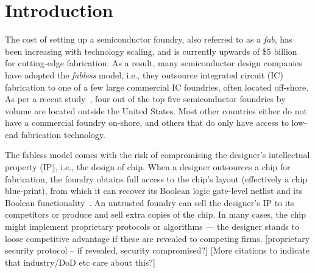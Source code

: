 \section{Introduction}

The cost of setting up a semiconductor foundry, also referred to 
as a \emph{fab}, 
has been increasing with technology scaling, and is 
currently upwards of \$5 billion~\cite{FoundryCost} for 
cutting-edge fabrication.
As a result, 
many semiconductor design companies have 
adopted the \textit{fabless} model, i.e., they outsource integrated circuit (IC) fabrication to one of a few large commercial IC foundries, often located off-shore. 
As per a recent study~\cite{}, 
four out of the 
top five semiconductor foundries by 
volume are located outside the United States. Most other countries  
either do not have a commercial 
foundry on-shore, and others that do only have access to low-end fabrication technology.  

The fabless model comes with the risk of compromising the 
designer's intellectual property (IP), i.e., the design of chip. 
When a designer outsources a chip for fabrication, the 
foundry obtains full access 
to the chip's layout (effectively a chip blue-print), 
from which it can 
recover its Boolean logic gate-level 
netlist and its 
Boolean 
functionality~\cite{rajendran2012security}.
An untrusted 
foundry can sell the designer's IP 
to its competitors or produce and sell extra copies of the 
chip. 
In many cases, the chip might implement proprietary 
protocols or algorithms --- the designer stands to loose competitive 
advantage if these are revealed to competing firms. 
[proprietary security protocol -- if revealed, security compromised?] 
[More citations to indicate that industry/DoD etc care about this?]~\cite{castillo2007ipp,kahng2001constraint,koushanfar2001hardware,musker1998protecting}  



